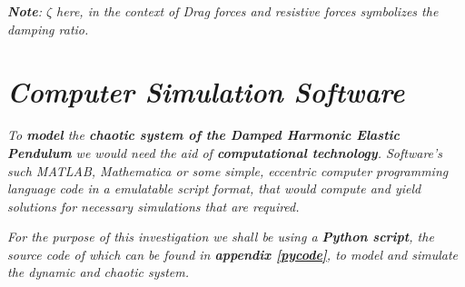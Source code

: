    \textit{\textbf{Note}: $\zeta$ here, in the context of Drag forces and resistive forces symbolizes the damping ratio.}
            
\section{\textit{Computer Simulation Software}}
        
    \textit{To \textbf{model} the \textbf{chaotic system of the Damped Harmonic Elastic Pendulum} we would need the aid of \textbf{computational technology}. Software's such MATLAB, Mathematica or some simple, eccentric computer programming language code in a emulatable script format, that would compute and yield solutions for necessary simulations that are required.}
    
    \textit{For the purpose of this investigation we shall be using a \textbf{Python script}, the source code of which can be found in \textbf{appendix \ref{pycode}}, to model and simulate the dynamic and chaotic system.}
        
        


